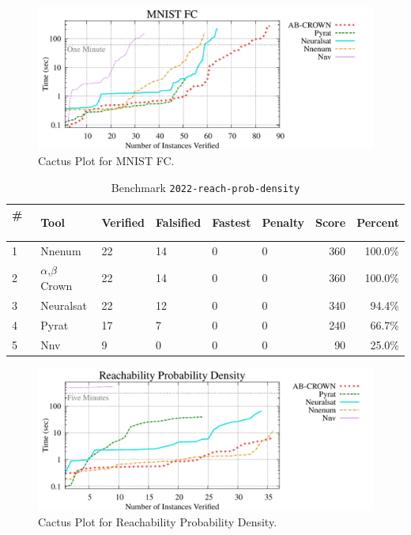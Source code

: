 \begin{figure}[h]
\centerline{\includegraphics[width=\textwidth]{cactus/2022_mnist_fc.pdf}}
\caption{Cactus Plot for MNIST FC.}
\label{fig:quantPic}
\end{figure}



\begin{table}[h]
\begin{center}
\caption{Benchmark \texttt{2022-reach-prob-density}} \label{tab:cat_{cat}}
{\setlength{\tabcolsep}{2pt}
\begin{tabular}[h]{@{}llllllrr@{}}
\toprule
\textbf{\# ~} & \textbf{Tool} & \textbf{Verified} & \textbf{Falsified} & \textbf{Fastest} & \textbf{Penalty} & \textbf{Score} & \textbf{Percent}\\
\midrule
1 & Nnenum & 22 & 14 & 0 & 0 & 360 & 100.0\% \\
2 & $\alpha$,$\beta$ Crown & 22 & 14 & 0 & 0 & 360 & 100.0\% \\
3 & Neuralsat & 22 & 12 & 0 & 0 & 340 & 94.4\% \\
4 & Pyrat & 17 & 7 & 0 & 0 & 240 & 66.7\% \\
5 & Nnv & 9 & 0 & 0 & 0 & 90 & 25.0\% \\
\bottomrule
\end{tabular}
}
\end{center}
\end{table}



\begin{figure}[h]
\centerline{\includegraphics[width=\textwidth]{cactus/2022_reach_prob_density.pdf}}
\caption{Cactus Plot for Reachability Probability Density.}
\label{fig:quantPic}
\end{figure}


